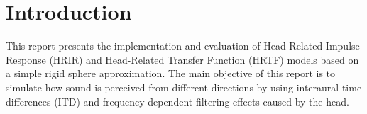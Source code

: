 \chapter{Introduction}
\label{ch:introduction}

This report presents the implementation and evaluation of Head-Related Impulse Response (HRIR) and Head-Related Transfer Function (HRTF) models based on a simple rigid sphere approximation. The main objective of this report is to simulate how sound is perceived from different directions by using interaural time differences (ITD) and frequency-dependent filtering effects caused by the head.

